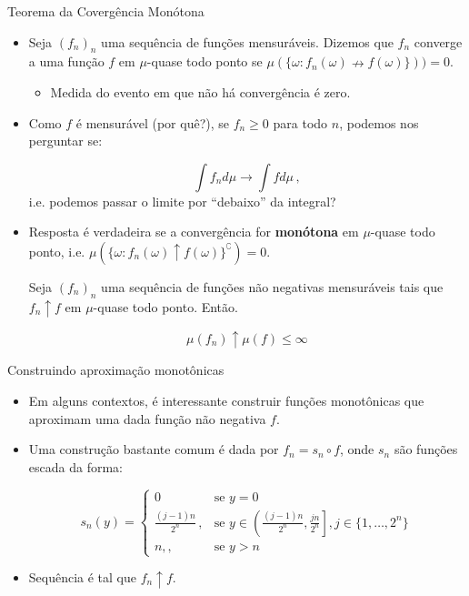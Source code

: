 \documentclass[11pt]{beamer}
\begin{document}
	\begin{frame}{Teorema da Covergência Monótona}
		\begin{itemize}
	\item Seja $(f_n)_n$ uma sequência de funções mensuráveis. Dizemos que $f_n$ converge a uma função $f$ em $\mu$-quase todo ponto se $\mu(\{\omega: f_n(\omega) \nrightarrow f(\omega)\})) = 0$.
	\begin{itemize}
		\item Medida do evento em que não há convergência é zero.
	\end{itemize}
	\item 	Como $f$  é mensurável (por quê?),  se $f_n \geq 0$ para todo $n$, podemos nos perguntar se:
	
	$$\int f_n d \mu \to \int f d \mu\, ,$$
	i.e. podemos passar o limite por ``debaixo'' da integral?
	\item Resposta é verdadeira se a convergência for \textbf{monótona}  em $\mu$-quase todo ponto, i.e. $\mu(\{\omega: f_n(\omega) \uparrow f(\omega)\}^\complement) = 0$.
	\begin{theorem}
		Seja $(f_n)_n$ uma sequência de funções não negativas mensuráveis tais que $f_n \uparrow f$ em $\mu$-quase todo ponto. Então.
		
		$$\mu(f_n) \uparrow \mu(f)\leq \infty$$
	\end{theorem}
	\end{itemize}
	\end{frame}
	
	\begin{frame}{Construindo aproximação monotônicas}
\begin{itemize}
	\item Em alguns contextos, é interessante construir funções monotônicas que aproximam uma dada função não negativa $f$. 
	\item Uma construção bastante comum é dada por $f_n = s_n \circ f$, onde $s_n$ são funções escada da forma:
	
	$$s_n(y) = \begin{cases}
		0 & \text{se } y = 0\\
		\frac{(j-1) n}{2^n}\,, &  \text{se } y \in \left(	\frac{(j-1) n}{2^n} , 	\frac{j n}{2^n}\right], j \in \{1,\ldots, 2^n\} \\
		n,, & \text{se } y > n
	\end{cases}$$
	\item Sequência é tal que $f_n \uparrow f$.
\end{itemize}

	\end{frame}
	
\end{document}
